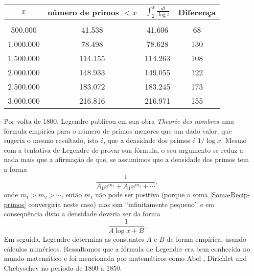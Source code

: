     \begin{table}[H]
        \centering
        \begin{tabular}{cccc}
             $x$& número de primos $< x$ & $\displaystyle \int_{2}^{x} \frac{dt}{\log t}$ &  Diferença\\[0.45cm]
             \hline\\[-0.3cm]
             500.000   & 41.538  & 41.606  & 68  \\[0.1cm]
             1.000.000 & 78.498  & 78.628  & 130 \\[0.1cm]
             1.500.000 & 114.155 & 114.263 & 108 \\[0.1cm]
             2.000.000 & 148.933 & 149.055 & 122 \\[0.1cm]
             2.500.000 & 183.072 & 183.245 & 173 \\[0.1cm]
             3.000.000 & 216.816 & 216.971 & 155
        \end{tabular}
        \caption{}
        \label{Tabela-Lehmer}
    \end{table}
    
    Por volta de 1800, Legendre publicou em sua obra \textit{Theorie des nombres} \cite{legendre1830} uma fórmula empírica para o número de primos menores que um dado valor, que sugeria o mesmo resultado, isto é, que a densidade dos primos é $1/\log x$. Mesmo com a tentativa de Legendre de provar sua fórmula, o seu argumento se reduz a nada mais que a afirmação de que, se assumimos que a densidade dos primos tem a forma
    $$\frac{1}{A_1x^{m_1} + A_1x^{m_2} + \cdots},$$
    onde $m_1 > m_2> \cdots$, então $m_1$ não pode ser positivo (porque a soma \eqref{Soma-Recip-primos} convergiria neste caso) mas sim ``infinitamente pequeno'' e 
    em consequência disto a densidade 
    deveria ser da forma
    $$\frac{1}{A \log x + B}.$$
    Em seguida, Legendre determina as constantes $A$ e $B$ de forma empírica, usando cálculos numéricos. 
    Ressaltamos que a fórmula de 
    Legendre era bem conhecida no mundo matemático e foi mencionada por matemáticos como Abel \cite{Abel-Holmboe}, Dirichlet \cite{Dirichlet38} 
    and Chebyschev \cite{Chebyshev52} no período de 1800 a 1850.
    
